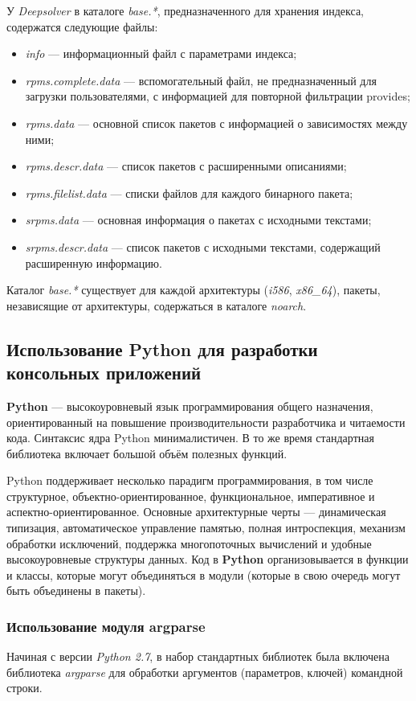 У \textit{Deepsolver} в каталоге \textit{base.*}, предназначенного для хранения индекса,
содержатся следующие файлы:\\
\begin{itemize}
\item{\textit{info} --- информационный файл с параметрами индекса;} 
\item{\textit{rpms.complete.data} --- вспомогательный файл, не предназначенный
для загрузки пользователями, с информацией для повторной фильтрации
provides;}
\item{\textit{rpms.data} --- основной список пакетов с информацией о зависимостях между ними;}
\item{\textit{rpms.descr.data} --- список пакетов с расширенными описаниями;}
\item{\textit{rpms.filelist.data} --- списки файлов для каждого бинарного пакета;}
\item{\textit{srpms.data} --- основная информация о пакетах с исходными текстами;}
\item{\textit{srpms.descr.data} --- список пакетов с исходными текстами, содержащий
расширенную информацию.}
\end{itemize} 
Каталог  \textit{base.*} существует для каждой архитектуры (\textit{i586}, \textit{x86\_64}), пакеты,
независящие от архитектуры, содержаться в каталоге \textit{noarch}.\\
\subsection{Использование Python для разработки консольных приложений}
\textbf{Python} --- высокоуровневый язык программирования общего назначения, ориентированный на повышение производительности разработчика и читаемости кода. Синтаксис ядра Python минималистичен. В то же время стандартная библиотека включает большой объём полезных функций\cite{wiki_python}.

Python поддерживает несколько парадигм программирования, в том числе структурное, объектно-ориентированное, 
функциональное, императивное и аспектно-ориентированное. Основные архитектурные черты --- динамическая типизация, 
автоматическое управление памятью, полная интроспекция, механизм обработки исключений, поддержка многопоточных вычислений 
и удобные высокоуровневые структуры данных. 
Код в \textbf{Python} организовывается в функции и классы, которые могут объединяться в модули (которые в свою очередь могут быть объединены в пакеты).

\subsubsection{Использование модуля argparse}
Начиная с версии \textit{Python 2.7}, в набор стандартных библиотек была включена 
библиотека \textit{argparse} для обработки аргументов (параметров, ключей) командной строки.


